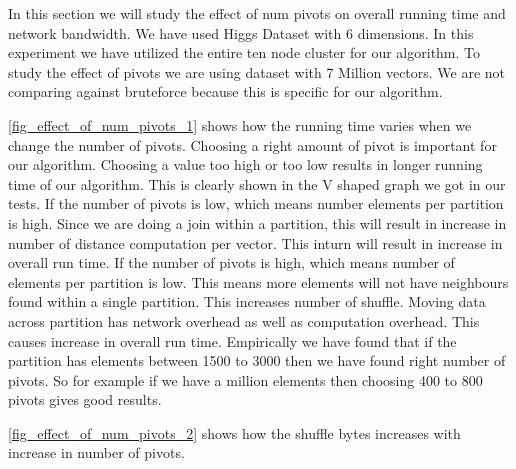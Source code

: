 In this section we will study the effect of num pivots on overall running
time and network bandwidth.
We have used Higgs Dataset with 6 dimensions. In this experiment we
have utilized the entire ten node cluster for our
algorithm. To study the effect of pivots we are using dataset with 7
Million vectors. We are not comparing against bruteforce because this
is specific for our algorithm.

\cref{fig_effect_of_num_pivots_1} shows how
the running time varies when we change the number of pivots. Choosing
a right amount of pivot is important for our algorithm. Choosing a
value too high or too low results in longer running time of our
algorithm. This is clearly shown in the V shaped graph we got in our
tests. If the number of pivots is low, which means number elements per
partition is high. Since we are doing a join within a partition, this
will result in increase in number of distance computation per
vector. This inturn will result in increase in overall run time. If
the number of pivots is high, which means number of elements per
partition is low. This means more elements will not have neighbours
found within a single partition. This increases number of
shuffle. Moving data across partition has network overhead as well as
computation overhead. This causes increase in overall run time.
Empirically we have found that if the partition has elements between
1500 to 3000 then we have found right number of pivots. So for example
if we have a million elements then choosing 400 to 800 pivots gives
good results.

\cref{fig_effect_of_num_pivots_2} shows how the shuffle bytes
increases with increase in number of pivots.

